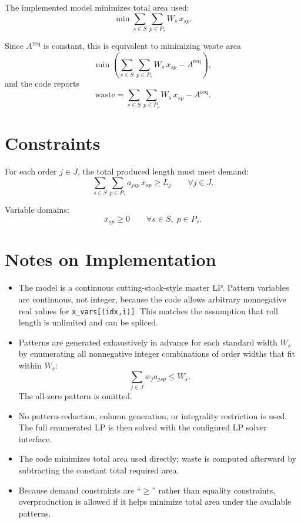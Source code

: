 The implemented model minimizes total area used:
\[
\min \sum_{s\in S}\sum_{p\in P_s} W_s\,x_{sp}.
\]

Since $A^{\mathrm{req}}$ is constant, this is equivalent to minimizing waste area
\[
\min \left(\sum_{s\in S}\sum_{p\in P_s} W_s\,x_{sp} - A^{\mathrm{req}}\right),
\]
and the code reports
\[
\text{waste}=\sum_{s\in S}\sum_{p\in P_s} W_s\,x_{sp}-A^{\mathrm{req}}.
\]

\section*{Constraints}

For each order $j \in J$, the total produced length must meet demand:
\[
\sum_{s\in S}\sum_{p\in P_s} a_{jsp}\,x_{sp} \ge L_j
\qquad \forall j \in J.
\]

Variable domains:
\[
x_{sp}\ge 0
\qquad \forall s\in S,\; p\in P_s.
\]

\section*{Notes on Implementation}

\begin{itemize}
    \item The model is a continuous cutting-stock-style master LP. Pattern variables are continuous, not integer, because the code allows arbitrary nonnegative real values for \texttt{x\_vars[(idx,i)]}. This matches the assumption that roll length is unlimited and can be spliced.
    \item Patterns are generated exhaustively in advance for each standard width $W_s$ by enumerating all nonnegative integer combinations of order widths that fit within $W_s$:
    \[
    \sum_{j\in J} w_j a_{jsp} \le W_s.
    \]
    The all-zero pattern is omitted.
    \item No pattern-reduction, column generation, or integrality restriction is used. The full enumerated LP is then solved with the configured LP solver interface.
    \item The code minimizes total area used directly; waste is computed afterward by subtracting the constant total required area.
    \item Because demand constraints are ``$\ge$'' rather than equality constraints, overproduction is allowed if it helps minimize total area under the available patterns.
\end{itemize}

